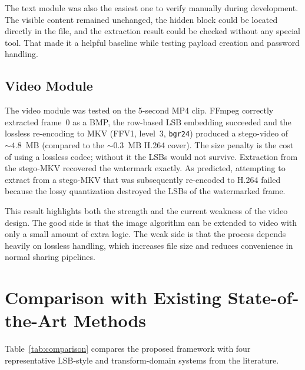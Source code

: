 The text module was also the easiest one to verify manually during development. The visible content remained unchanged, the hidden block could be located directly in the file, and the extraction result could be checked without any special tool. That made it a helpful baseline while testing payload creation and password handling.

\subsection{Video Module}
\label{sec:video_results}

The video module was tested on the 5-second MP4 clip. FFmpeg correctly extracted frame~0 as a BMP, the row-based LSB embedding succeeded and the lossless re-encoding to MKV (FFV1, level~3, \texttt{bgr24}) produced a stego-video of $\sim 4.8$~MB (compared to the $\sim 0.3$~MB H.264 cover). The size penalty is the cost of using a lossless codec; without it the LSBs would not survive. Extraction from the stego-MKV recovered the watermark exactly. As predicted, attempting to extract from a stego-MKV that was subsequently re-encoded to H.264 failed because the lossy quantization destroyed the LSBs of the watermarked frame.

This result highlights both the strength and the current weakness of the video design. The good side is that the image algorithm can be extended to video with only a small amount of extra logic. The weak side is that the process depends heavily on lossless handling, which increases file size and reduces convenience in normal sharing pipelines.

\section{Comparison with Existing State-of-the-Art Methods}
\label{sec:comparison}

Table~\ref{tab:comparison} compares the proposed framework with four representative LSB-style and transform-domain systems from the literature.

